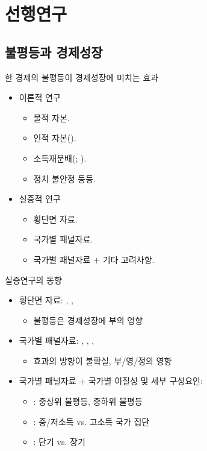 \documentclass[handout, 10pt]{beamer}
\begin{document}
\section{선행연구}

\subsection{불평등과 경제성장}
\begin{frame}{한 경제의 불평등이 경제성장에 미치는 효과}
    \begin{itemize}
        \item 이론적 연구
        \begin{itemize}
            \item 물적 자본.
            \item 인적 자본(\cite{gnz93}).
            \item 소득재분배(\cite{anr94}; \cite{pnt94}).
            \item 정치 불안정 등등.
        \end{itemize}
        \item 실증적 연구
        \begin{itemize}
            \item 횡단면 자료.
            \item 국가별 패널자료.
            \item 국가별 패널자료 $+$ 기타 고려사항.
        \end{itemize}
    \end{itemize}
\end{frame}

\begin{frame}{실증연구의 동향}
    \begin{itemize}
        \item 횡단면 자료: \cite{barro91}, \cite{anr94}, \cite{pnt94}
        \begin{itemize}
            \item 불평등은 경제성장에 부의 영향
        \end{itemize}
        \item 국가별 패널자료: \cite{lnz98}, \cite{barro20}, \cite{forbes00}, \cite{bnd03}
        \begin{itemize}
            \item 효과의 방향이 불확실, 부/영/정의 영향
        \end{itemize}
        \item 국가별 패널자료 + 국가별 이질성 및 세부 구성요인:
        \begin{itemize}
            \item \cite{voit05, voit11}: 중상위 불평등, 중하위 불평등
            \item \cite{cc10}: 중/저소득 vs. 고소득 국가 집단
            \item \cite{hetl14}: 단기 vs. 장기
        \end{itemize}
    \end{itemize}
\end{frame}
\end{document}
